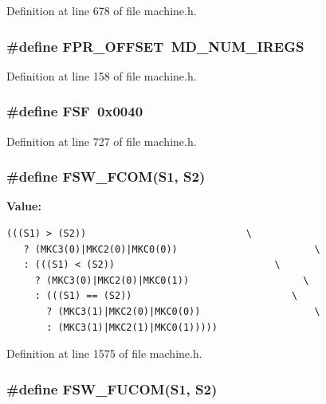Definition at line 678 of file machine.h.
\subsubsection[{FPR\_\-OFFSET}]{\setlength{\rightskip}{0pt plus 5cm}\#define FPR\_\-OFFSET~MD\_\-NUM\_\-IREGS}\label{machine_8h_f333dd3611a980e3e16fd74b2181b557}




Definition at line 158 of file machine.h.
\subsubsection[{FSF}]{\setlength{\rightskip}{0pt plus 5cm}\#define FSF~0x0040}\label{machine_8h_488abb99c7151e7e6e2383c0da2dd2de}




Definition at line 727 of file machine.h.
\subsubsection[{FSW\_\-FCOM}]{\setlength{\rightskip}{0pt plus 5cm}\#define FSW\_\-FCOM(S1, \/  S2)}\label{machine_8h_29f47f69068e71b5888585b9155299e1}


\textbf{Value:}

\begin{Code}\begin{verbatim}(((S1) > (S2))                            \
   ? (MKC3(0)|MKC2(0)|MKC0(0))                        \
   : (((S1) < (S2))                            \
     ? (MKC3(0)|MKC2(0)|MKC0(1))                    \
     : (((S1) == (S2))                            \
       ? (MKC3(1)|MKC2(0)|MKC0(0))                    \
       : (MKC3(1)|MKC2(1)|MKC0(1)))))
\end{verbatim}
\end{Code}


Definition at line 1575 of file machine.h.
\subsubsection[{FSW\_\-FUCOM}]{\setlength{\rightskip}{0pt plus 5cm}\#define FSW\_\-FUCOM(S1, \/  S2)}\label{machine_8h_d0bb5bea4b36a417fb7b7c3bb0b5af65}


